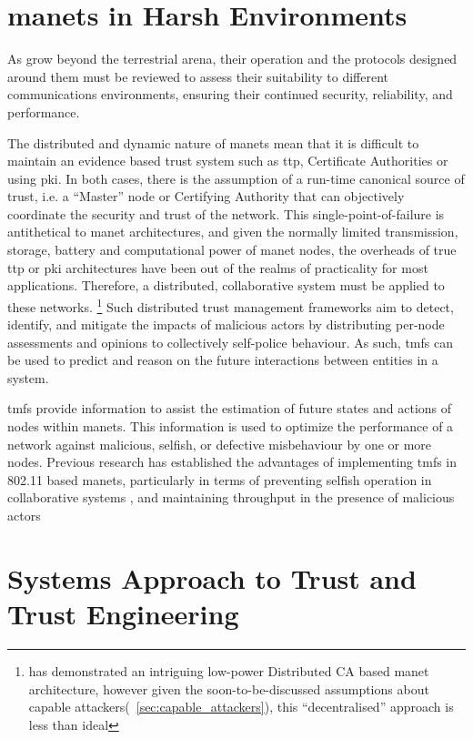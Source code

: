 \section{\glspl{manet} in Harsh Environments}

As  grow beyond the terrestrial arena, their operation and the protocols designed around them must be reviewed to assess their suitability to different communications environments, ensuring their continued security, reliability, and performance.

The distributed and dynamic nature of \glspl{manet} mean that it is difficult to maintain an evidence based trust system such as \gls{ttp}, Certificate Authorities or using \gls{pki}. 
In both cases, there is the assumption of a run-time canonical source of trust, i.e. a ``Master'' node or Certifying Authority that can objectively coordinate the security and trust of the network.
This single-point-of-failure is antithetical to \gls{manet} architectures, and given the normally limited transmission, storage, battery and computational power of \gls{manet} nodes, the overheads of true \gls{ttp} or \gls{pki} architectures have been out of the realms of practicality for most applications.
Therefore, a distributed, collaborative system must be applied to these networks.
\footnote{ \citet{Zouridaki} has demonstrated an intriguing low-power Distributed CA based \gls{manet} architecture, however given the soon-to-be-discussed assumptions about capable attackers(~\autoref{sec:capable_attackers}), this ``decentralised'' approach is less than ideal}
Such distributed trust management frameworks aim to detect, identify, and mitigate the impacts of malicious actors by distributing per-node assessments and opinions to collectively self-police behaviour.
As such, \glspl{tmf} can be used to predict and reason on the future interactions between entities in a system.

\glspl{tmf} provide information to assist the estimation of future states and actions of nodes within \glspl{manet}.
This information is used to optimize the performance of a network against malicious, selfish, or defective misbehaviour by one or more nodes.
Previous research has established the advantages of implementing \glspl{tmf} in 802.11 based \glspl{manet}, particularly in terms of preventing selfish operation in collaborative systems \cite{Li2007}, and maintaining throughput in the presence of malicious actors \cite{Buchegger2002}

\section{Systems Approach to Trust and Trust Engineering}



